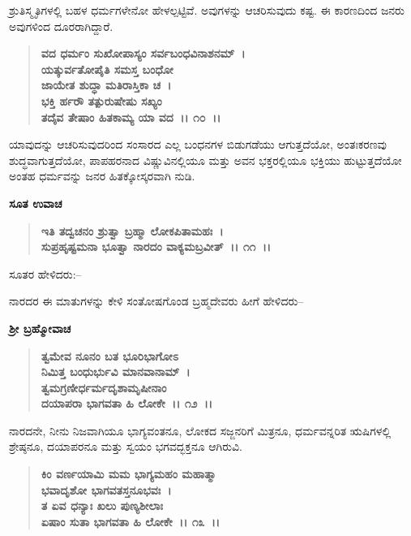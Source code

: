 ಶ್ರುತಿಸ್ಮೃತಿಗಳಲ್ಲಿ ಬಹಳ ಧರ್ಮಗಳೇನೋ ಹೇಳಲ್ಪಟ್ಟಿವೆ. ಅವುಗಳನ್ನು ಆಚರಿಸುವುದು ಕಷ್ಟ. ಈ ಕಾರಣದಿಂದ ಜನರು ಅವುಗಳಿಂದ ದೂರರಾಗಿದ್ದಾರೆ.

\begin{verse}
\textbf{ವದ ಧರ್ಮಂ ಸುಖೋಪಾಸ್ಯಂ ಸರ್ವಬಂಧವಿನಾಶನಮ್~।}\\\textbf{ಯತ್ಕುರ್ವತೋಪೈತಿ ಸಮಸ್ತ ಬಂಧೋ }\\\textbf{ಜಾಯೇತ ಶುದ್ಧಾ ಮತಿರಾಸ್ತಿಕಾ ಚ~।}\\\textbf{ಭಕ್ತಿ ರ್ಹರೌ ತತ್ಪುರುಷೇಷು ಸಖ್ಯಂ }\\\textbf{ತದೈವ ತೇಷಾಂ ಹಿತಕಾಮ್ಯ ಯಾ ವದ~।। ೧೦~।।}
\end{verse}

ಯಾವುದನ್ನು ಆಚರಿಸುವುದರಿಂದ ಸಂಸಾರದ ಎಲ್ಲ ಬಂಧನಗಳ ಬಿಡುಗಡೆಯು ಆಗುತ್ತದೆಯೋ, ಅಂತಃಕರಣವು ಶುದ್ಧವಾಗುತ್ತದೆಯೋ, ಪಾಪಹರನಾದ ವಿಷ್ಣುವಿನಲ್ಲಿಯೂ ಮತ್ತು ಅವನ ಭಕ್ತರಲ್ಲಿಯೂ ಭಕ್ತಿಯು ಹುಟ್ಟುತ್ತದೆಯೋ ಅಂತಹ ಧರ್ಮವನ್ನು ಜನರ ಹಿತಕ್ಕೋಸ್ಕರವಾಗಿ ನುಡಿ.

\begin{flushleft}
\textbf{ಸೂತ ಉವಾಚ}
\end{flushleft}

\begin{verse}
\textbf{ಇತಿ ತದ್ವಚನಂ ಶ್ರುತ್ವಾ ಬ್ರಹ್ಮಾ ಲೋಕಪಿತಾಮಹಃ~।}\\\textbf{ಸುಪ್ರಹೃಷ್ಟಮನಾ ಭೂತ್ವಾ ನಾರದಂ ವಾಕ್ಯಮಬ್ರವೀತ್~।। ೧೧~।।}
\end{verse}

\noindent
ಸೂತರ ಹೇಳಿದರು:–

ನಾರದರ ಈ ಮಾತುಗಳನ್ನು ಕೇಳಿ ಸಂತೋಷಗೊಂಡ ಬ್ರಹ್ಮದೇವರು ಹೀಗೆ ಹೇಳಿದರು–

\begin{flushleft}
\textbf{ಶ‍್ರೀ ಬ್ರಹ್ಮೋವಾಚ}
\end{flushleft}

\begin{verse}
\textbf{ತ್ವಮೇವ ನೂನಂ ಬತ ಭೂರಿಭಾಗೋಽ}\\\textbf{ನಿಮಿತ್ತ ಬಂಧುರ್ಭುವಿ ಮಾನವಾನಾಮ್~।}\\\textbf{ತ್ವಮಗ್ರಣೀರ್ಧರ್ಮದೃಶಾಮೃಷೀನಾಂ } \\\textbf{ದಯಾಪರಾ ಭಾಗವತಾ ಹಿ ಲೋಕೇ~।। ೧೨~।।}
\end{verse}

ನಾರದನೇ, ನೀನು ನಿಜವಾಗಿಯೂ ಭಾಗ್ಯವಂತನೂ, ಲೋಕದ ಸಜ್ಜನರಿಗೆ ಮಿತ್ರನೂ, ಧರ್ಮವನ್ನರಿತ ಋಷಿಗಳಲ್ಲಿ ಶ್ರೇಷ್ಠನೂ, ದಯಾಪರನೂ ಮತ್ತು ಸ್ವಯಂ ಭಗವದ್ಭಕ್ತನೂ ಆಗಿರುವಿ.

\begin{verse}
\textbf{ಕಿಂ ವರ್ಣಯಾಮಿ ಮಮ ಭಾಗ್ಯಮಹಂ ಮಹಾತ್ಮಾ}\\\textbf{ಭವಾದೃಶೋ ಭಾಗವತಸ್ತನೂಭವಃ~।}\\\textbf{ತ ಏವ ಧನ್ಯಾಃ ಖಲು ಪುಣ್ಯಶೀಲಾಃ}\\\textbf{ಏಷಾಂ ಸುತಾ ಭಾಗವತಾ ಹಿ ಲೋಕೇ~।। ೧೩~।।}
\end{verse}

